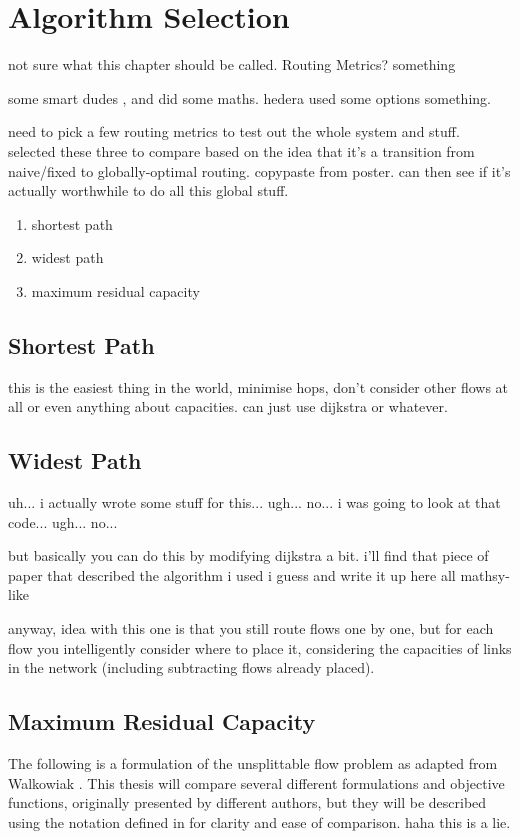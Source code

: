 \chapter{Algorithm Selection}

not sure what this chapter should be called. Routing Metrics? something

some smart dudes \cite{bonsma:ufp}, \cite{anag:mazing} and \cite{chakrabarti:ufp} did some maths. hedera used some options something.

need to pick a few routing metrics to test out the whole system and stuff. selected these three to compare based on the idea that it's a transition from naive/fixed to globally-optimal routing. copypaste from poster. can then see if it's actually worthwhile to do all this global stuff.

\begin{enumerate}
  \item shortest path
  \item widest path
  \item maximum residual capacity
\end{enumerate}

\section{Shortest Path}
this is the easiest thing in the world, minimise hops, don't consider other flows at all or even anything about capacities. can just use dijkstra or whatever.

\section{Widest Path}
uh... i actually wrote some stuff for this... ugh... no... i was going to look at that code... ugh... no...

but basically you can do this by modifying dijkstra a bit. i'll find that piece of paper that described the algorithm i used i guess and write it up here all mathsy-like

anyway, idea with this one is that you still route flows one by one, but for each flow you intelligently consider where to place it, considering the capacities of links in the network (including subtracting flows already placed).

\section{Maximum Residual Capacity}
The following is a formulation of the unsplittable flow problem as adapted from Walkowiak \cite{walkowiak:residual}. This thesis will compare several different formulations and objective functions, originally presented by different authors, but they will be described using the notation defined in \cite{walkowiak:residual} for clarity and ease of comparison. haha this is a lie.

